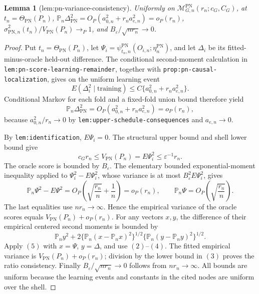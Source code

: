\documentclass{article}
\newtheorem{lemma}{Lemma}
\begin{document}
\begin{lemma}[lem:pn-variance-consistency]\label{lem:pn-variance-consistency}
Uniformly on \(\mathcal M_{G,n}^{\mathrm{PN}}(r_n;c_G,C_G)\), at \(t_n=\Theta_{\mathrm{PN}}(P_n)\), \(\mathbb P_n\Delta_{\mathrm{PN}}^2=O_P(a_{0,n}^2+r_na_{e,n}^2)=o_P(r_n)\), \(\widehat\sigma_{\mathrm{PN},n}^2(t_n)/V_{\mathrm{PN}}(P_n)\to_P1\), and \(B_\varepsilon/\sqrt{nr_n}\to0\).
\end{lemma}
\begin{proof}
Put \(t_n=\Theta_{\mathrm{PN}}(P_n)\), let \(\Psi_i=\psi_{t_n,n}^{\mathrm{PN}}(O_{i,n};\eta_n^{\mathrm{PN}})\), and let \(\Delta_i\) be its fitted-minus-oracle held-out difference. The conditional second-moment calculation in \texttt{lem:pn-score-learning-remainder}, together with \texttt{prop:pn-causal-localization}, gives on the uniform learning event
\[E(\Delta_i^2\mid\text{training})\le C\{a_{0,n}^2+r_na_{e,n}^2\}.\tag{1}\]
Conditional Markov for each fold and a fixed-fold union bound therefore yield
\[\mathbb P_n\Delta_{\mathrm{PN}}^2=O_P(a_{0,n}^2+r_na_{e,n}^2)=o_P(r_n),\tag{2}\]
because \(a_{0,n}^2/r_n\to0\) by \texttt{lem:upper-schedule-consequences} and \(a_{e,n}\to0\).

By \texttt{lem:identification}, \(E\Psi_i=0\). The structural upper bound and shell lower bound give
\[c_Gr_n\le V_{\mathrm{PN}}(P_n)=E\Psi_i^2\le\varepsilon^{-1}r_n.\tag{3}\]
The oracle score is bounded by \(B_\varepsilon\). The elementary bounded exponential-moment inequality applied to \(\Psi_i^2-E\Psi_i^2\), whose variance is at most \(B_\varepsilon^2E\Psi_i^2\), gives
\[\mathbb P_n\Psi^2-E\Psi^2=O_P\!\left(\sqrt{\frac{r_n}{n}}+\frac1n\right)=o_P(r_n),\qquad \mathbb P_n\Psi=O_P\!\left(\sqrt{\frac{r_n}{n}}\right).\tag{4}\]
The last equalities use \(nr_n\to\infty\). Hence the empirical variance of the oracle scores equals \(V_{\mathrm{PN}}(P_n)+o_P(r_n)\). For any vectors \(x,y\), the difference of their empirical centered second moments is bounded by
\[\mathbb P_n y^2+2\{\mathbb P_n(x-\mathbb P_nx)^2\}^{1/2}\{\mathbb P_n(y-\mathbb P_ny)^2\}^{1/2}.\tag{5}\]
Apply \((5)\) with \(x=\Psi\), \(y=\Delta\), and use \((2)\)--\((4)\). The fitted empirical variance is \(V_{\mathrm{PN}}(P_n)+o_P(r_n)\); division by the lower bound in \((3)\) proves the ratio consistency. Finally \(B_\varepsilon/\sqrt{nr_n}\to0\) follows from \(nr_n\to\infty\). All bounds are uniform because the learning events and constants in the cited nodes are uniform over the shell.
\end{proof}
\end{document}
